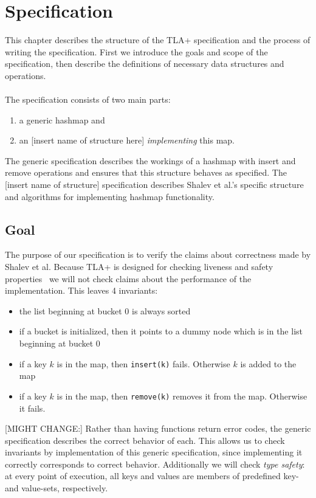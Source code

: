 \documentclass{uit-thesis}
\begin{document}
\chapter{Specification}\label{ch:specification}
This chapter describes the structure of the TLA+ specification and the process of writing the specification. First we introduce the goals and scope of the specification, then describe the definitions of necessary data structures and operations.
\\\\
The specification consists of two main parts:
\begin{enumerate}
    \item a generic hashmap and
    \item an [insert name of structure here] \textit{implementing} this map.
\end{enumerate}
The generic specification describes the workings of a hashmap with insert and remove operations and ensures that this structure behaves as specified. The [insert name of structure] specification describes Shalev et al.'s specific structure and algorithms for implementing hashmap functionality.

\section{Goal}\label{sec:spec-goals}
The purpose of our specification is to verify the claims about correctness made by Shalev et al. Because TLA+ is designed for checking liveness and safety properties~\cite{Lund2019} we will not check claims about the performance of the implementation. This leaves 4 invariants:
\begin{itemize}
    \item the list beginning at bucket 0 is always sorted
    \item if a bucket is initialized, then it points to a dummy node which is in the list beginning at bucket 0
    \item if a key $k$ is in the map, then \texttt{insert(k)} fails. Otherwise $k$ is added to the map
    \item if a key $k$ is in the map, then \texttt{remove(k)} removes it from the map. Otherwise it fails.
\end{itemize}
[MIGHT CHANGE:] Rather than having functions return error codes, the generic specification describes the correct behavior of each. This allows us to check invariants by implementation of this generic specification, since implementing it correctly corresponds to correct behavior.
Additionally we will check \textit{type safety}: at every point of execution, all keys and values are members of predefined key- and value-sets, respectively.
\end{document}
